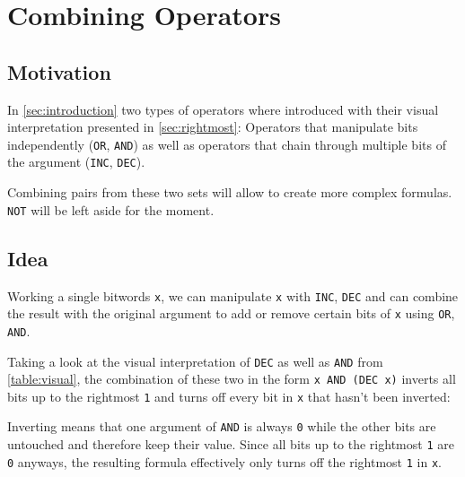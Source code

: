 \section{Combining Operators}\label{sec:combining}


\subsection*{Motivation}
In \autoref{sec:introduction} two types of operators where introduced
with their visual interpretation presented in \autoref{sec:rightmost}:
Operators that manipulate bits independently
(\lstinline$OR$, \lstinline$AND$)
as well as operators that chain through multiple bits of the argument
(\lstinline$INC$, \lstinline$DEC$).

Combining pairs from these two sets will allow
to create more complex formulas.
\lstinline$NOT$ will be left aside for the moment.


\subsection*{Idea}
Working a single bitwords \lstinline$x$, we can
manipulate \lstinline$x$ with \lstinline$INC$, \lstinline$DEC$
and can combine the result with the original argument
to add or remove certain bits of \lstinline$x$
using \lstinline$OR$, \lstinline$AND$.

Taking a look at the visual interpretation
of \lstinline$DEC$ as well as \lstinline$AND$ from \autoref{table:visual},
the combination of these two in the form \lstinline$x AND (DEC x)$
inverts all bits up to the rightmost \lstinline$1$
and turns off every bit in \lstinline$x$ that hasn't been inverted:

Inverting means that one argument of \lstinline$AND$ is always \lstinline$0$
while the other bits are untouched and therefore keep their value.
Since all bits up to the rightmost \lstinline$1$ are \lstinline$0$ anyways,
the resulting formula effectively only turns off the rightmost \lstinline$1$
in \lstinline$x$.
